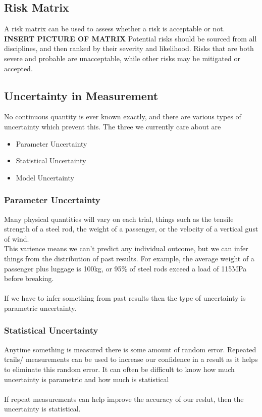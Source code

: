 \documentclass[12pt,a4paper]{article}
\begin{document}
	\subsection{Risk Matrix}
		A risk matrix can be used to assess whether a risk is acceptable or not.\\
		\textbf{INSERT PICTURE OF MATRIX}
		Potential risks should be sourced from all disciplines, and then ranked by their severity and likelihood. Risks that are both severe and probable are unacceptable, while other risks may be mitigated or accepted.
		
	\subsection{Uncertainty in Measurement}
		No continuous quantity is ever known exactly, and there are various types of uncertainty which prevent this. The three we currently care about are 
		\begin{itemize}
			\item Parameter Uncertainty
			\item Statistical Uncertainty
			\item Model Uncertainty
		\end{itemize}
		
		\subsubsection{Parameter Uncertainty}
			Many physical quantities will vary on each trial, things such as the tensile strength of a steel rod, the weight of a passenger, or the velocity of a vertical gust of wind. \\
			This varience means we can't predict any individual outcome, but we can infer things from the distribution of past results. For example, the average weight of a passenger plus luggage is 100kg, or 95\% of steel rods exceed a load of 115MPa before breaking.\\
			\\
			If we have to infer something from past results then the type of uncertainty is parametric uncertainty.
			
		\subsubsection{Statistical Uncertainty}
			Anytime something is measured there is some amount of random error. Repeated trails/ measurements can be used to increase our confidence in a result as it helps to eliminate this random error. It can often be difficult to know how much uncertainty is parametric and how much is statistical \\
			\\
			If repeat measurements can help improve the accuracy of our reslut, then the uncertainty is statistical.
			
\end{document}
